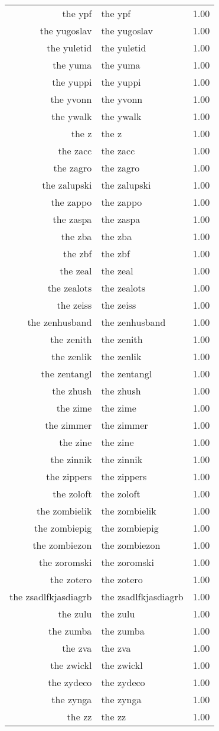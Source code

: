 \begin{table}[ht]
\begin{tabular}{rlr}
  the ypf & the ypf & 1.00 \\ 
  the yugoslav & the yugoslav & 1.00 \\ 
  the yuletid & the yuletid & 1.00 \\ 
  the yuma & the yuma & 1.00 \\ 
  the yuppi & the yuppi & 1.00 \\ 
  the yvonn & the yvonn & 1.00 \\ 
  the ywalk & the ywalk & 1.00 \\ 
  the z & the z & 1.00 \\ 
  the zacc & the zacc & 1.00 \\ 
  the zagro & the zagro & 1.00 \\ 
  the zalupski & the zalupski & 1.00 \\ 
  the zappo & the zappo & 1.00 \\ 
  the zaspa & the zaspa & 1.00 \\ 
  the zba & the zba & 1.00 \\ 
  the zbf & the zbf & 1.00 \\ 
  the zeal & the zeal & 1.00 \\ 
  the zealots & the zealots & 1.00 \\ 
  the zeiss & the zeiss & 1.00 \\ 
  the zenhusband & the zenhusband & 1.00 \\ 
  the zenith & the zenith & 1.00 \\ 
  the zenlik & the zenlik & 1.00 \\ 
  the zentangl & the zentangl & 1.00 \\ 
  the zhush & the zhush & 1.00 \\ 
  the zime & the zime & 1.00 \\ 
  the zimmer & the zimmer & 1.00 \\ 
  the zine & the zine & 1.00 \\ 
  the zinnik & the zinnik & 1.00 \\ 
  the zippers & the zippers & 1.00 \\ 
  the zoloft & the zoloft & 1.00 \\ 
  the zombielik & the zombielik & 1.00 \\ 
  the zombiepig & the zombiepig & 1.00 \\ 
  the zombiezon & the zombiezon & 1.00 \\ 
  the zoromski & the zoromski & 1.00 \\ 
  the zotero & the zotero & 1.00 \\ 
  the zsadlfkjasdiagrb & the zsadlfkjasdiagrb & 1.00 \\ 
  the zulu & the zulu & 1.00 \\ 
  the zumba & the zumba & 1.00 \\ 
  the zva & the zva & 1.00 \\ 
  the zwickl & the zwickl & 1.00 \\ 
  the zydeco & the zydeco & 1.00 \\ 
  the zynga & the zynga & 1.00 \\ 
  the zz & the zz & 1.00 \\ 
   \hline
\end{tabular}
\end{table}
